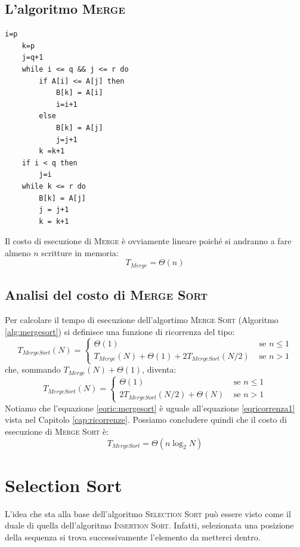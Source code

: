 \subsection{L'algoritmo \textsc{Merge}}
\begin{lstlisting}[caption={\textsc{Merge}(A,p,q,r)},language=asd]
	i=p
	k=p
	j=q+1
	while i <= q && j <= r do
		if A[i] <= A[j] then
			B[k] = A[i]
			i=i+1
		else
			B[k] = A[j]
			j=j+1
		k =k+1
	if i < q then
		j=i
	while k <= r do
		B[k] = A[j]
		j = j+1
		k = k+1
\end{lstlisting}

Il costo di esecuzione di \textsc{Merge} è ovviamente lineare poiché si andranno a fare almeno $n$ scritture in memoria:
\begin{displaymath}
	T_{Merge}=\Theta(n)
\end{displaymath}

\subsection{Analisi del costo di \textsc{Merge Sort}}
Per calcolare il tempo di esecuzione dell'algortimo \textsc{Merge Sort} (Algoritmo \ref{alg:mergesort}) si definisce una funzione di ricorrenza del tipo:
\begin{displaymath}
	T_{MergeSort}(N)=
	\begin{cases}
		\Theta(1) & \mbox{ se } n \leq 1\\
		T_{Merge}(N)+\Theta(1) +2 T_{MergeSort}(N/2) & \mbox{ se } n > 1
	\end{cases}
\end{displaymath}
che, sommando $T_{Merge}(N)+\Theta(1)$, diventa:
\begin{equation}\label{eqric:mergesort}
	T_{MergeSort}(N)=
	\begin{cases}
		\Theta(1) & \mbox{ se } n \leq 1\\
		2 T_{MergeSort}(N/2) + \Theta(N) & \mbox{ se } n > 1
	\end{cases}
\end{equation}
Notiamo che l'equazione \ref{eqric:mergesort} è uguale all'equazione \ref{eqricorrenza1} vista nel Capitolo \ref{cap:ricorrenze}. Possiamo concludere quindi che il costo di esecuzione di \textsc{Merge Sort} è:
\begin{displaymath}
	T_{MergeSort}=\Theta(n \log_{2}N)
\end{displaymath}

\section{Selection Sort}
L'idea che sta alla base dell'algoritmo \textsc{Selection Sort} può essere visto come il duale di quella dell'algoritmo \textsc{Insertion Sort}. Infatti, selezionata una posizione della sequenza si trova successivamente l'elemento da metterci dentro.

